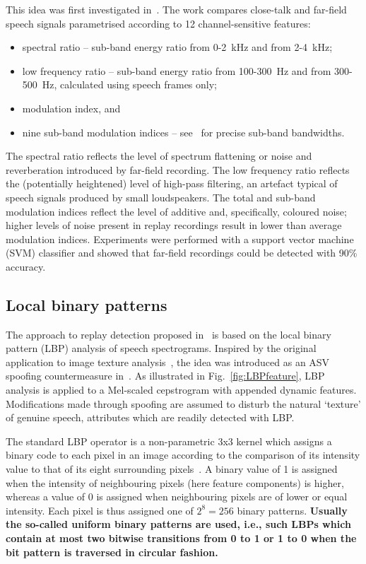 This idea was first investigated in~\cite{Villalba2011}.  The work compares close-talk and far-field speech signals parametrised according to 12 channel-sensitive features:


\begin{itemize}
\item spectral ratio -- sub-band energy ratio from 0-2~kHz and from 2-4~kHz; 
\item low frequency ratio -- sub-band energy ratio from 100-300~Hz and from 300-500~Hz, calculated using speech frames only;
\item modulation index, and
\item nine sub-band modulation indices -- see~\cite{Villalba2011} for precise sub-band bandwidths.
\end{itemize}


The spectral ratio reflects the level of spectrum flattening or noise and reverberation introduced by far-field recording.  The low frequency ratio reflects the (potentially heightened) level of high-pass filtering, an artefact typical of speech signals produced by small loudspeakers.  The total and sub-band modulation indices reflect the level of additive and, specifically, coloured noise; higher levels of noise present in replay recordings result in lower than average modulation indices.  Experiments were performed with a support vector machine (SVM) classifier and showed that far-field recordings could be detected with 90\% accuracy.  %



\subsection{Local binary patterns}


The approach to replay detection proposed in~\cite{Alegre2014} is based on the local binary pattern (LBP) analysis of speech spectrograms.  
Inspired by the original application to image texture analysis~\cite{Ojala2002}, the idea was introduced as an ASV spoofing countermeasure in~\cite{Alegre2013a}.  
As illustrated in Fig.~\ref{fig:LBPfeature}, LBP analysis is applied to a Mel-scaled cepstrogram with appended dynamic features.  Modifications made through spoofing are assumed to disturb the natural `texture' of genuine speech, attributes which are readily detected with LBP.   

The standard LBP operator is a non-parametric 3x3 kernel which assigns a binary code to each pixel in an image according to the comparison of its intensity value to that of its eight surrounding pixels~\cite{Ojala2002}. 
A binary value of 1 is assigned when the intensity of neighbouring pixels (here feature components) is higher, whereas a value of 0 is assigned when neighbouring pixels are of lower or equal intensity. Each pixel is thus assigned one of $2^8=256$ binary patterns. {\bfseries Usually the so-called uniform binary patterns are used, i.e., such LBPs which contain at most two bitwise transitions from 0 to 1 or 1 to 0 when the bit pattern is traversed in circular fashion.}


